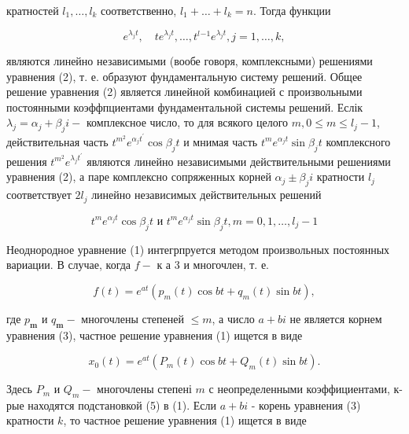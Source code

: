 \documentclass[10pt]{article}
\begin{document}
кратностей $l_{1}, \ldots, l_{k}$ соответственно, $l_{1}+\ldots+l_{k}=n$. Тогда функции



\[

e^{\lambda_{j} t}, \quad t e^{\lambda_{j} t}, \ldots, t^{l}{ }^{-1} e^{\lambda_{j} t}, j=1, \ldots, k,

\]



являются линейно независимыми (вообе говоря, комплексными) решениями уравнения (2), т. е. образуют фундаментальную систему решений. Общее решение уравнения (2) является линейной комбинацией с произвольными постоянными коэффпциентами фундаментальной системы решений. Еслік $\lambda_{j}=\alpha_{j}+\beta_{j} i-$ комплексное число, то для всякого целого $m, 0 \leqslant m \leqslant l_{j}-1$, действительная часть $t^{m^{2}} e^{\alpha_{j} t^{\prime}} \cos \beta_{j} t$ и мнимая часть $t^{m} e^{\alpha_{j} t} \sin \beta_{j} t$ комплексного решения $t^{m^{2}} e^{\lambda_{j} t^{\prime}}$ являются линейно независимыми действительными решениями уравнения (2), а паре комплексно сопряженных корней $\alpha_{j} \pm \beta_{j} i$ кратности $l_{j}$ соответствует $2 l_{j}$ линейно независимых действительных решений



\[

t^{m} e^{\alpha_{j} t} \cos \beta_{j} t \text { и } t^{m} e^{\alpha_{j} t} \sin \beta_{j} t, m=0,1, \ldots, l_{j}-1

\]



Неоднородное уравнение (1) интегрпруется методом произвольных постоянных вариации. В случае, когда $f-$ к а 3 и многочлен, т. е.



\[

f(t)=e^{a t}\left(p_{m}(t) \cos b t+q_{m}(t) \sin b t\right),

\]



где $p_{\boldsymbol{m}}$ и $q_{\boldsymbol{m}}-$ многочлены степеней $\leqslant m$, а число $a+b i$ не является корнем уравнения (3), частное решение уравнения (1) ищется в виде



\[

x_{0}(t)=e^{a t}\left(P_{m}(t) \cos b t+Q_{m}(t) \sin b t\right) .

\]



Здесь $P_{m}$ и $Q_{m}-$ многочлены степені $m$ с неопределенными коэффициентами, к-рые находятся подстановкой (5) в (1). Если $a+b i$ - корень уравнения (3) кратности $k$, то частное решение уравнения (1) ищется в виде
\end{document}

